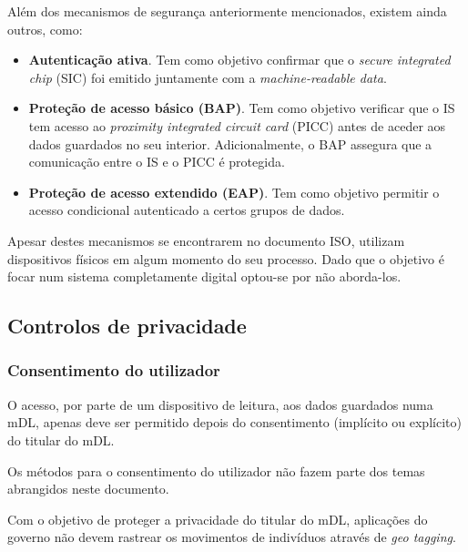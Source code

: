 Além dos mecanismos de segurança anteriormente mencionados, existem ainda outros, como:

\begin{itemize}
    \item \textbf{Autenticação ativa}. Tem como objetivo confirmar que o \emph{secure integrated chip} (SIC) foi emitido juntamente com a \emph{machine-readable data}.
    \item \textbf{Proteção de acesso básico (BAP)}. Tem como objetivo verificar que o IS tem acesso ao \emph{proximity integrated circuit card} (PICC) antes de aceder aos dados guardados no seu interior. Adicionalmente, o BAP assegura que a comunicação entre o IS e o PICC é protegida. 
    \item \textbf{Proteção de acesso extendido (EAP)}. Tem como objetivo permitir o acesso condicional autenticado a certos grupos de dados.
\end{itemize}

Apesar destes mecanismos se encontrarem no documento ISO, utilizam dispositivos físicos 
em algum momento do seu processo. Dado que o objetivo é focar num sistema 
completamente digital optou-se por não aborda-los.


\subsection{Controlos de privacidade}
\label{sec:org1279156}
\subsubsection{Consentimento do utilizador}
\label{sec:orga2915d6}

O acesso, por parte de um dispositivo de leitura, aos dados guardados numa
mDL, apenas deve ser permitido depois do consentimento (implícito ou
explícito) do titular do mDL.

Os métodos para o consentimento do utilizador não fazem parte dos temas
abrangidos neste documento.

Com o objetivo de proteger a privacidade do titular do mDL, aplicações do
governo não devem rastrear os movimentos de indivíduos através de \emph{geo
tagging}.

